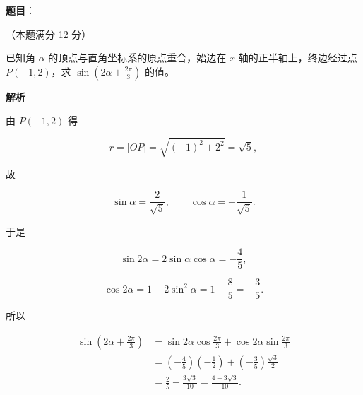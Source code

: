 
\begin{answer}

\textbf{题目}：

（本题满分 12 分）

已知角 $\alpha$ 的顶点与直角坐标系的原点重合，始边在 $x$ 轴的正半轴上，终边经过点 $P(-1,2)$，求 $\sin\left(2\alpha+\frac{2\pi}{3}\right)$ 的值。

\textbf{解析}

由 $P(-1,2)$ 得

\nopagebreak[4]
\[
r=|OP|=\sqrt{(-1)^2+2^2}=\sqrt5,
\]

故

\nopagebreak[4]
\[
\sin\alpha=\frac{2}{\sqrt5},\qquad \cos\alpha=-\frac{1}{\sqrt5}.
\]

于是

\nopagebreak[4]
\[
\sin 2\alpha=2\sin\alpha\cos\alpha=-\frac45,
\]

\nopagebreak[4]
\[
\cos 2\alpha=1-2\sin^2\alpha=1-\frac85=-\frac35.
\]

所以

\nopagebreak[4]
\[
\begin{aligned}
\sin\left(2\alpha+\frac{2\pi}{3}\right)
&=\sin 2\alpha\cos\frac{2\pi}{3}+\cos 2\alpha\sin\frac{2\pi}{3}\\
&=\left(-\frac45\right)\left(-\frac12\right)
+\left(-\frac35\right)\frac{\sqrt3}{2}\\
&=\frac25-\frac{3\sqrt3}{10}
=\frac{4-3\sqrt3}{10}.
\end{aligned}
\]


\end{answer}
